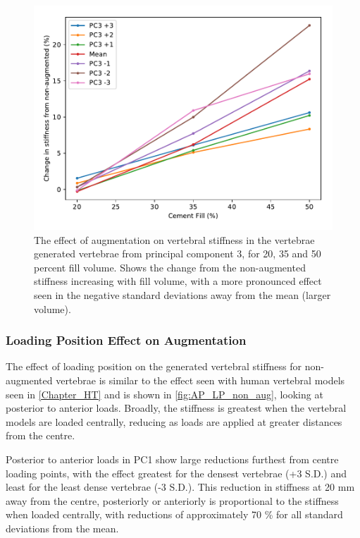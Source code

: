 \begin{figure}[h]
  \centering
  \includegraphics[width=.9\textwidth]{Chapters/Chapter_PCA_images/pca_percent_fill_pc3.pdf}
  \caption[Effect of augmentation in principal component 3.]{The effect of augmentation on vertebral stiffness in the vertebrae generated vertebrae from principal component 3, for 20, 35 and 50 percent fill volume. Shows the change from the non-augmented stiffness increasing with fill volume, with a more pronounced effect seen in the negative standard deviations away from the mean (larger volume).}
  \label{fig:pca_percent_fill_pc3}
\end{figure}


\subsubsection{Loading Position Effect on Augmentation }


The effect of loading position on the generated vertebral stiffness for non-augmented vertebrae is similar to the effect seen with human vertebral models seen in \cref{Chapter_HT} and is shown in \cref{fig:AP_LP_non_aug}, looking at posterior to anterior loads.
Broadly, the stiffness is greatest when the vertebral models are loaded centrally, reducing as loads are applied at greater distances from the centre.

Posterior to anterior loads in PC1 show large reductions furthest from centre loading points, with the effect greatest for the densest vertebrae (+3 S.D.) and least for the least dense vertebrae (-3 S.D.).
This reduction in stiffness at 20 mm away from the centre, posteriorly or anteriorly is proportional to the stiffness when loaded centrally, with reductions of approximately 70 \% for all standard deviations from the mean.

